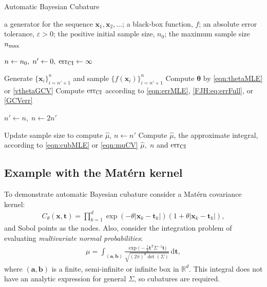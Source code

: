 \documentclass[twocolumn]{svjour3}          %
\newcommand{\bm}[1]{\boldsymbol{#1}}
\newcommand{\mSigma}{\mathsf{\Sigma}}
\newcommand{\dif}[1]{\text{d}{#1}}
\newcommand{\reals}{\mathbb{R}}
\newcommand{\vtheta}{{\bm{\theta}}}
\newcommand{\va}{\bm{a}}
\newcommand{\vb}{\bm{b}}
\newcommand{\vt}{\bm{t}}
\newcommand{\vx}{\bm{x}}
\newcommand{\dvt}{\dif{\bm{t}}}
\newcommand{\hmu}{\widehat{\mu}}
\newcommand{\err}{\textup{err}}
\begin{document}
\begin{algorithm}
\caption{Automatic Bayesian Cubature}\label{algorithm1}
  \begin{algorithmic}[1]
  	\Require a generator for the sequence
  	$\vx_1, \vx_2, \ldots$; 
  	a black-box function, $f$; 
  	an absolute error tolerance,
  	$\varepsilon>0$; the positive initial sample size, $n_0$;
  	the maximum sample size $n_{\textup{max}}$
  	
      \State $n \gets n_0, \; n' \gets 0, \; \err_{\textup{CI}} \gets \infty$
      
      \While{$\err_{\textup{CI}} > \varepsilon$ and $n \le n_{\textup{max}}$}
      
        \State\label{LoopStart}Generate $\{ \vx_i\}_{i=n' + 1}^{n}$ and sample $\{f(\vx_i)\}_{i=n'+1}^{n}$
        \State Compute $\vtheta$ by \eqref{eqn:thetaMLE} or \eqref{vthetaGCV}
        \State Compute $\err_{\textup{CI}}$  according to \eqref{eqn:errMLE}, \eqref{FJH:eq:errFull}, or \eqref{GCVerr}
        
       	\State	$n' \gets n, \; n \gets 2n'$
        
        \EndWhile
        
        \State Update sample size to compute $\hmu$, $n \gets n'$
        \State Compute $\hmu$, the approximate integral,   according to \eqref{eqn:cubMLE} or \eqref{eqn:muCV}
      \State \Return $\hmu, \; n$  and $\err_{\textup{CI}}$
  \end{algorithmic}
\end{algorithm}

\subsection{Example with the Mat\'ern kernel} \label{MVN_example}

To demonstrate automatic Bayesian cubature consider a Mat\'ern covariance kernel:
\begin{align*}
C_{\theta}(\vx, \vt) = \prod_{k=1}^d \exp(-\theta|\vx_k-\vt_k|)(1+\theta |\vx_k-\vt_k|),
\end{align*}
and Sobol points as the nodes.
Also, consider the integration problem of evaluating  \emph{multivariate normal probabilities}:
\begin{align}
\label{eqn:GaussDef}
\mu = \int_{(\va,\vb)} \frac{\exp\bigl(- \frac 12 \vt^T \mSigma^{-1} \vt \bigr)}{\sqrt{(2 \pi)^d \det(\mSigma)}} \, \dvt,
\end{align}
where $(\va,\vb)$ is a finite, semi-infinite or infinite box in $\reals^d$.  This integral does not have an analytic expression for general $\mSigma$, so cubatures are required.  
\end{document}
